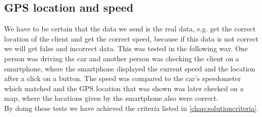 \subsection{GPS location and speed}
We have to be certain that the data we send is the real data, e.g. get the correct location of the client and get the correct speed, because if this data is not correct we will get false and incorrect data. This was tested in the following way.
One person was driving the car and another person was checking the client on a smartphone, where the smartphone displayed the current speed and the location after a click on a button. The speed was compared to the car's speedometer which matched and the GPS location that was shown was later checked on a map, where the locations given by the smartphone also were correct.
\\
By doing these tests we have achieved the criteria listed in \autoref{chap:solutioncriteria}.
